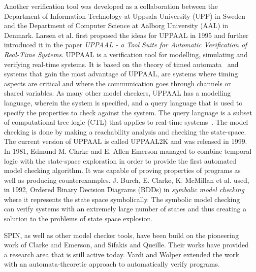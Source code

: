 Another verification tool was developed as a collaboration between the Department of Information Technology at Uppsala University (UPP) in Sweden and the Department of Computer Science at Aalborg University (AAL) in Denmark. Larsen et al. first proposed the ideas for UPPAAL\cite{Larsen1995} in 1995 and further introduced it in the paper \textit{UPPAAL - a Tool Suite for Automatic Verification of Real-Time Systems}\cite{Bengtsson1995}.
UPPAAL is a verification tool for modelling, simulating and verifying real-time systems. It is based on the theory of timed automata~\cite{Hopcroft2001}\cite{Alur1990} and systems that gain the most advantage of UPPAAL, are systems where timing aspects are critical and where the communication goes through channels or shared variables.
As many other model checkers, UPPAAL has a modelling language, wherein the system is specified, and a query language that is used to specify the properties to check against the system. The query language is a subset of computational tree logic (CTL) that applies to real-time systems~\cite{Henzinger1994}\cite{Larsen1995}. The model checking is done by making a reachability analysis and checking the state-space. The current version of UPPAAL is called UPPAAL2K and was released in 1999\cite{Amnell2001}.\\

In 1981, Edmund M. Clarke and E. Allen Emerson managed to combine temporal logic with the state-space exploration in order to provide the first automated model checking algorithm\cite{Clarke1981}. It was capable of proving properties of programs as well as producing counterexamples.
J. Burch, E. Clarke, K. McMillan et al. used, in 1992, Ordered Binary Decision Diagrams (BDDs) in \textit{symbolic model checking}~\cite{Burch1992} where it represents the state space symbolically. The symbolic model checking can verify systems with an extremely large number of states and thus creating a solution to the problems of state space explosion.

SPIN, as well as other model checker tools, have been build on the pioneering work of Clarke and Emerson\cite{Clarke1981}, and Sifakis and Queille\cite{Queille1982}. Their works have provided a research area that is still active today. Vardi and Wolper extended the work with an automata-theoretic approach to automatically verify programs\cite{Vardi1986}.\\

